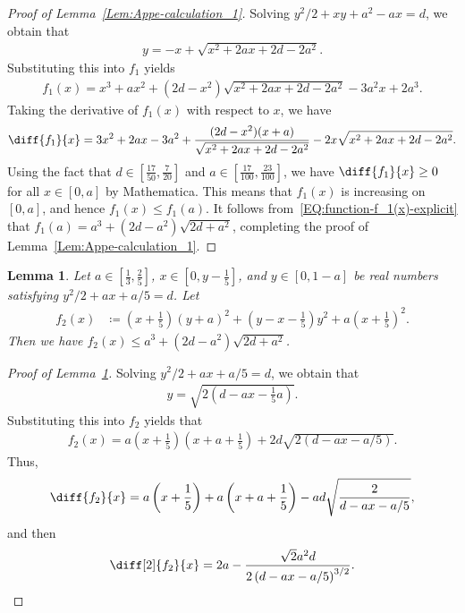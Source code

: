 \documentclass[11pt,a4paper]{article}
\newtheorem{lemma}[definition]{Lemma}
\begin{document}
\begin{appendix}
\begin{proof}[Proof of Lemma~\ref{Lem:Appe-calculation_1}]
Solving $ y^2/2 + xy + a^2 - a x = d$, we obtain that 
\begin{align*}
y = -x + \sqrt{x^2 + 2ax +2d-2a^2}. 
\end{align*}
Substituting this into $f_1$ yields 
\begin{align}\label{EQ:function-f_1(x)-explicit}
f_1(x) = x^3 + a x^2 +(2d-x^2) \sqrt{ x^2+2 a x + 2 d-2 a^2} - 3 a^2 x + 2 a^3.  
\end{align}
Taking the derivative of $f_1(x)$ with respect to $x$, we have 
\begin{align*}
\diff{f_1}{x} = 3x^2 + 2a x-3a^2 + \frac{(2d-x^2)(x+a)}{\sqrt{x^2+2 a x + 2 d-2 a^2}} -2x\sqrt{ x^2+2 a x + 2 d-2 a^2}. 
\end{align*}
Using the fact that $d \in \left[\tfrac{17}{50}, \tfrac{7}{20}\right]$ and  $a \in \left[\tfrac{17}{100}, \tfrac{23}{100}\right]$, we have $\diff{f_1}{x} \ge 0$ for all $x \in \left[0,a\right]$ by Mathematica. 
This means that $f_1(x)$ is increasing on $[0,a]$, and hence $f_1(x) \le f_1(a)$. 
It follows from~\eqref{EQ:function-f_1(x)-explicit} that $f_1(a) = a^3 + (2d-a^2)\sqrt{2d+a^2}$, completing the proof of Lemma~\ref{Lem:Appe-calculation_1}. 
\end{proof}


\begin{lemma}\label{Lem:calculation_2}
Let  $ a \in \left[\tfrac{1}{3},\tfrac{2}{5}\right]$, $x \in \left[0,y-\tfrac{1}{5}\right]$, and $y \in \left[0,1-a \right]$ be real numbers satisfying $y^2/2 + ax+ a/5 = d$. 
Let 
\begin{align*}
f_2(x) 
&\coloneqq \left(x+\frac{1}{5}\right)(y+a)^2+\left(y-x-\frac{1}{5}\right)y^2+a\left(x+\frac{1}{5}\right)^2. 
\end{align*}
Then we have $f_2(x) \le a^3 +(2d-a^2)\sqrt{2d+a^2}$. 
\end{lemma}

\begin{proof}[Proof of Lemma~\ref{Lem:calculation_2}]
Solving $y^2/2+ ax+ a/5=d$, we obtain that 
\begin{align}\label{EQ:expression-y-f2}
y = \sqrt{2 \left(d-ax-\frac{1}{5}a\right)}. 
\end{align}
Substituting this into $f_2$ yields that 
\begin{align*}
f_2(x) = a\left(x+\frac{1}{5}\right)\left(x+a+\frac{1}{5}\right)+ 2d \sqrt{2 \left(d-ax-a/5\right)}.
\end{align*}
Thus, 
\begin{align*}
\diff{f_2}{x} = a \left(x+\frac{1}{5}\right)+ a \left(x+a+\frac{1}{5}\right)- ad \sqrt{\frac{2}{d-ax-a/5}},
\end{align*}
and then
\begin{align*}
\diff[2]{f_2}{x} = 2a- \frac{\sqrt{2}a^2 d}{2\left(d-ax-a/5\right)^{3/2}}. 
\end{align*}


\end{proof}
\end{appendix}
\end{document}

